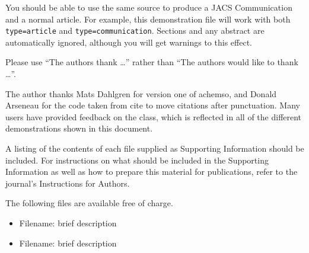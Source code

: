 \documentclass[journal=asbcd6,manuscript=article]{achemso}
\begin{document}
You should be able to use the same source to produce a JACS
Communication and a normal article.  For example, this demonstration
file will work with both \texttt{type=article} and
\texttt{type=communication}. Sections and any abstract are
automatically ignored, although you will get warnings to this effect.

\begin{acknowledgement}

Please use ``The authors thank \ldots'' rather than ``The
authors would like to thank \ldots''.

The author thanks Mats Dahlgren for version one of \textsf{achemso},
and Donald Arseneau for the code taken from \textsf{cite} to move
citations after punctuation. Many users have provided feedback on the
class, which is reflected in all of the different demonstrations
shown in this document.

\end{acknowledgement}

\begin{suppinfo}

A listing of the contents of each file supplied as Supporting Information
should be included. For instructions on what should be included in the
Supporting Information as well as how to prepare this material for
publications, refer to the journal's Instructions for Authors.

The following files are available free of charge.
\begin{itemize}
  \item Filename: brief description
  \item Filename: brief description
\end{itemize}

\end{suppinfo}


\end{document}
